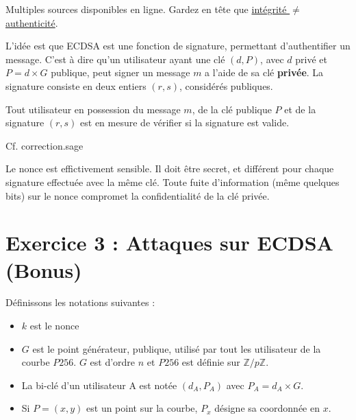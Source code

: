 \documentclass[fleqn, french,a4paper,11pt]{exam}
\newcommand{\Zp}[1]{\mathbb{Z}/{#1}\mathbb{Z}}
\begin{document}
	\begin{questions}
		\question Multiples sources disponibles en ligne. Gardez en tête que \href{https://security.stackexchange.com/questions/93322/difference-between-authentication-integrity-and-data-origin-authentication}{intégrité $\neq$ authenticité}.

		L'idée est que ECDSA est une fonction de signature, permettant d'authentifier un message. C'est à dire qu'un utilisateur ayant une clé $(d, P)$, avec $d$ privé et $P=d\times G$ publique, peut signer un message $m$ a l'aide de sa clé \textbf{privée}. La signature consiste en deux entiers $(r, s)$, considérés publiques.

		Tout utilisateur en possession du message $m$, de la clé publique $P$ et de la signature $(r, s)$ est en mesure de vérifier si la signature est valide.
		
		\question Cf. correction.sage
		
		\question Le nonce est effictivement sensible. Il doit être secret, et différent pour chaque signature effectuée avec la même clé. Toute fuite d'information (même quelques bits) sur le nonce compromet la confidentialité de la clé privée.
	\end{questions}
	
	\section*{Exercice 3 : Attaques sur ECDSA (Bonus)}

	Définissons les notations suivantes :
	\begin{itemize}
		\item $k$ est le nonce
		\item $G$ est le point générateur, publique, utilisé par tout les utilisateur de la courbe $P256$. $G$ est d'ordre $n$ et $P256$ est définie sur $\Zp{p}$.
		\item La bi-clé d'un utilisateur A est notée $(d_A, P_A)$ avec $P_A = d_A\times G$.
		\item Si $P = (x, y)$ est un point sur la courbe, $P_x$ désigne sa coordonnée en $x$.
	\end{itemize}
	
\end{document}
